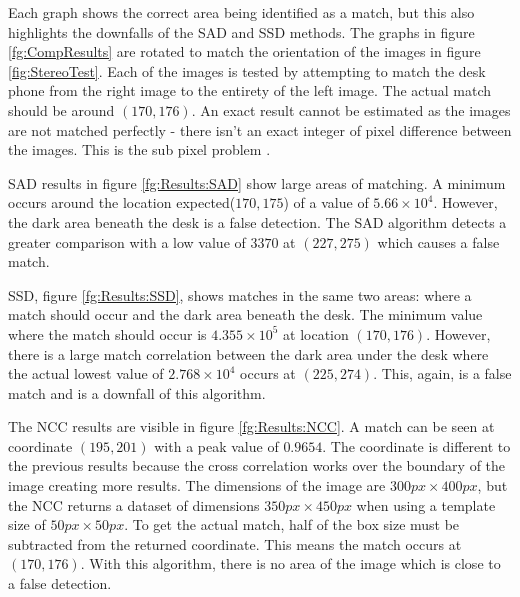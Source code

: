 Each graph shows the correct area being identified as a match, but this also highlights the downfalls of the SAD and SSD methods. The graphs in figure \ref{fg:CompResults} are rotated to match the orientation of the images in figure \ref{fig:StereoTest}. Each of the images is tested by attempting to match the desk phone from the right image to the entirety of the left image. The actual match should be around $(170, 176)$. An exact result cannot be estimated as the images are not matched perfectly - there isn't an exact integer of pixel difference between the images. This is the sub pixel problem \citep{haller2012design}.

SAD results in figure \ref{fg:Results:SAD} show large areas of matching. A minimum occurs around the location expected($170,175$) of a value of $5.66\times 10^4$. 
However, the dark area beneath the desk is a false detection. The SAD algorithm detects a greater comparison with a low value of $3370$ at $(227, 275)$ which causes a false match.

SSD, figure \ref{fg:Results:SSD}, shows matches in the same two areas: where a match should occur and the dark area beneath the desk. The minimum value where the match should occur is $4.355 \times 10^5$ at location $(170,176)$. However, there is a large match correlation between the dark area under the desk where the actual lowest value of $2.768\times10^4$ occurs at $(225,274)$. This, again, is a false match and is a downfall of this algorithm.

The NCC results are visible in figure \ref{fg:Results:NCC}. A match can be seen at coordinate $(195,201)$ with a peak value of $0.9654$. The coordinate is different to the previous results because the cross correlation works over the boundary of the image creating more results. The dimensions of the image are $300px \times 400px$, but the NCC returns a dataset of dimensions $350px \times 450px$ when using a template size of $50px\times 50px$. To get the actual match, half of the box size must be subtracted from the returned coordinate. This means the match occurs at $(170,176)$. With this algorithm, there is no area of the image which is close to a false detection. 

